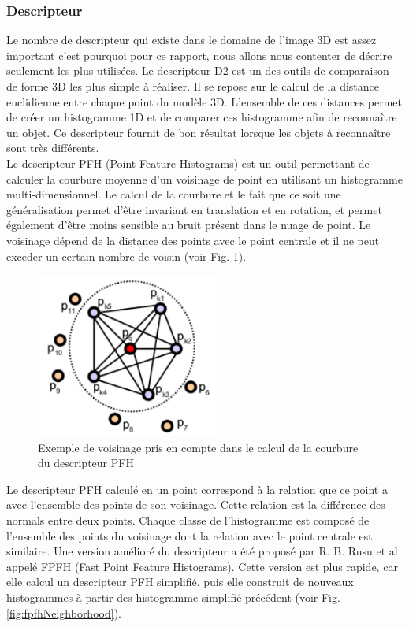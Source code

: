 \subsubsection{Descripteur}
\label{descriptor}
Le nombre de descripteur qui existe dans le domaine de l'image 3D est assez important c'est pourquoi pour ce rapport,
nous allons nous contenter de décrire seulement les plus utilisées. Le descripteur D2\cite{D2} est un des outils de 
comparaison de forme 3D les plus simple à réaliser. Il se repose sur le calcul de la distance euclidienne entre 
chaque point du modèle 3D. L'ensemble de ces distances permet de créer un histogramme 1D et de comparer ces histogramme
afin de reconnaître un objet. Ce descripteur fournit de bon résultat lorsque les objets à reconnaître sont très 
différents.\\

Le descripteur PFH\cite{PFH} (Point Feature Histograms) est un outil permettant de calculer la courbure moyenne d'un voisinage de point en utilisant un histogramme multi-dimensionnel. Le calcul de la courbure et le fait que ce soit une généralisation permet d'être invariant 
en translation et en rotation, et permet également d'être moins sensible au bruit présent dans le nuage de point. Le voisinage 
dépend de la distance des points avec le point centrale et il ne peut exceder un certain nombre de voisin 
(voir Fig. \ref{fig:pfhNeighborhood}).\\

\begin{figure}[!ht]
  \begin{center}
    \includegraphics[width=6cm]{image/PFH.png}
    \caption{Exemple de voisinage pris en compte dans le calcul de la courbure du descripteur PFH}
    \label{fig:pfhNeighborhood}
  \end{center}
\end{figure}

Le descripteur PFH calculé en un point correspond à la relation que ce point a avec l'ensemble des points de son voisinage. Cette relation
est la différence des normals entre deux points. Chaque classe de l'histogramme est composé de l'ensemble des points du voisinage dont 
la relation avec le point centrale est similaire. Une version amélioré du descripteur a été proposé par R. B. Rusu et al\cite{FPFH} appelé
FPFH (Fast Point Feature Histograms). Cette version est plus rapide, car elle calcul un descripteur PFH simplifié, puis elle construit
de nouveaux histogrammes à partir des histogramme simplifié précédent (voir Fig. \ref{fig:fpfhNeighborhood}).\\

